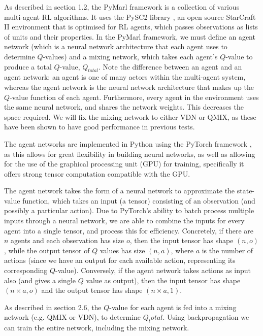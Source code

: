 As described in section 1.2, the PyMarl framework is a collection of various multi-agent RL algorithms. It uses the PySC2 library \cite{pysc2}, an open source StarCraft II environment that is optimised for RL agents, which passes observations as lists of units and their properties. In the PyMarl framework, we must define an agent network (which is a neural network architecture that each agent uses to determine $Q$-values) and a mixing network, which takes each agent's $Q$-value to produce a total $Q$-value, $Q_{total}$. Note the difference between an agent and an agent network: an agent is one of many actors within the multi-agent system, whereas the agent network is the neural network architecture that makes up the $Q$-value function of each agent. Furthermore, every agent in the environment uses the same neural network, and shares the network weights. This decreases the space required. We will fix the mixing network to either VDN or QMIX, as these have been shown to have good performance in previous tests. 

The agent networks are implemented in Python using the PyTorch framework \cite{pytorch}, as this allows for great flexibility in building neural networks, as well as allowing for the use of the graphical processing unit (GPU) for training, specifically it offers strong tensor computation compatible with the GPU.

The agent network takes the form of a neural network to approximate the state-value function, which takes an input (a tensor) consisting of an observation (and possibly a particular action). Due to PyTorch's ability to batch process multiple inputs through a neural network, we are able to combine the inputs for every agent into a single tensor, and process this for efficiency. Concretely, if there are $n$ agents and each observation has size $o$, then the input tensor has shape $(n, o)$, while the output tensor of $Q$ values has size $(n, a)$, where $a$ is the number of actions (since we have an output for each available action, representing its corresponding $Q$-value). Conversely, if the agent network takes actions as input also (and gives a single $Q$ value as output), then the input tensor has shape $(n \times a, o)$ and the output tensor has shape $(n \times a, 1)$.

As described in section 2.6, the $Q$-value for each agent is fed into a mixing network (e.g. QMIX or VDN), to determine $Q_total$. Using backpropagation we can train the entire network, including the mixing network.

